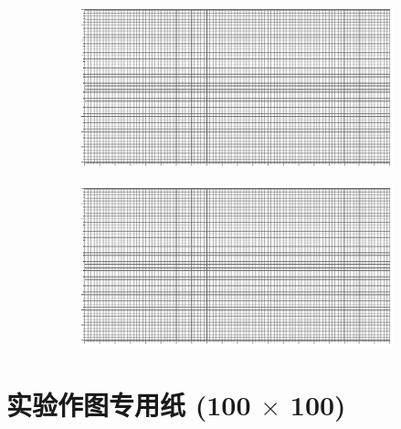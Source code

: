 \documentclass[UTF8]{article}
\begin{document}
\begin{figure}[H]\centering
\begin{subfigure}[b]{0.5\columnwidth}\centering
    \includegraphics[width=\columnwidth]{assets/100x50.pdf}
\end{subfigure}\hfill
\begin{subfigure}[b]{0.5\columnwidth}\centering
    \includegraphics[width=\columnwidth]{assets/100x50.pdf}
\end{subfigure}
\end{figure}


\newpage
\section*{实验作图专用纸 (100 $\times$ 100)}
\end{document}
